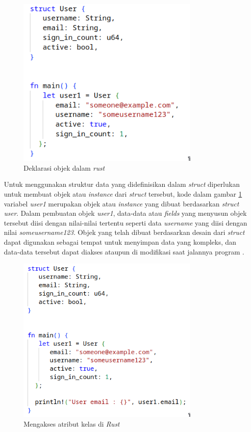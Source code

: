 \begin{figure}[H]
  \centering
  \includegraphics[keepaspectratio, width=9cm]{gambar/rust-object-declaration.png}
  \caption{Deklarasi objek dalam \emph{rust} \citep{rustbook}}
  \label{gambar:object-declaration-rust}
\end{figure}

Untuk menggunakan struktur data yang didefinisikan dalam \emph{struct} diperlukan untuk membuat objek atau \emph{instance} dari \emph{struct} tersebut, kode dalam gambar \ref{gambar:object-declaration-rust} variabel \emph{user1} merupakan objek atau \emph{instance} yang dibuat berdasarkan \emph{struct} \emph{user}. Dalam pembuatan objek \emph{user1}, data-data atau \emph{fields} yang menyusun objek tersebut diisi dengan nilai-nilai tertentu seperti data \emph{username} yang diisi dengan nilai \emph{someusername123}. Objek yang telah dibuat berdasarkan desain dari \emph{struct} dapat digunakan sebagai tempat untuk menyimpan data yang kompleks, dan data-data tersebut dapat diakses ataupun di modifikasi saat jalannya program \citep{rustbook}.

\begin{figure}[H]
  \centering
  \includegraphics[keepaspectratio, width=9cm]{gambar/rust-accessing-attributes.png}
  \caption{Mengakses atribut kelas di \emph{Rust} \citep{rustbook}}
  \label{gambar:attributes-accesing-rust}
\end{figure}

